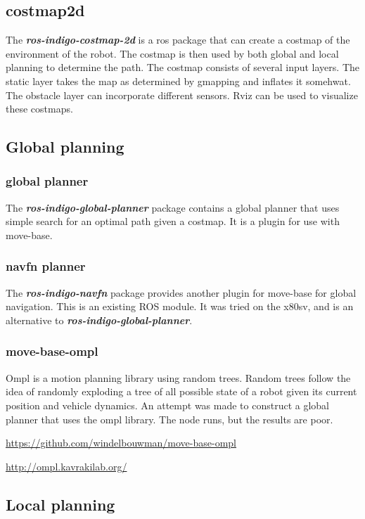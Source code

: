 \documentclass[a4paper]{article}
\newcommand{\rospackage}[1]{\textbf{\textit{ros-indigo-#1}}}
\begin{document}
\subsection{costmap2d}
The \rospackage{costmap-2d} is a ros package that can create a costmap of the environment
of the robot.
The costmap is then used by both global and local planning to determine the path.
The costmap consists of several input layers. The static layer takes the map as determined by
gmapping and inflates it somehwat. The obstacle layer can incorporate different sensors.
Rviz can be used to visualize these costmaps.

\subsection{Global planning}

\subsubsection{global planner}
The \rospackage{global-planner} package contains a global planner that uses simple search
for an optimal path given a costmap. It is a plugin for use with move-base.

\subsubsection{navfn planner}
The \rospackage{navfn} package provides another plugin for move-base for global navigation.
This is an existing ROS module. It was tried on the x80sv, and is an alternative to \rospackage{global-planner}.

\subsubsection{move-base-ompl}
Ompl is a motion planning library using random trees.
Random trees follow the idea of randomly exploding a tree of all possible state of a robot
given its current position and vehicle dynamics.
An attempt was made to construct a global planner that uses the ompl library.
The node runs, but the results are poor.

\url{https://github.com/windelbouwman/move-base-ompl}

\url{http://ompl.kavrakilab.org/}

\subsection{Local planning}
\end{document}
